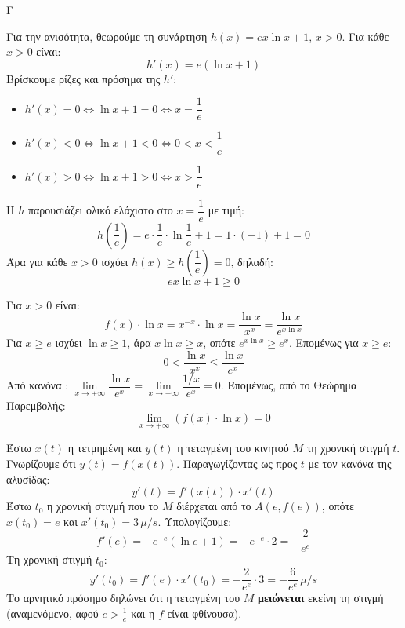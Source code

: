 \begin{thema}{Γ}
\begin{erwthma}
Για την ανισότητα, θεωρούμε τη συνάρτηση $h(x)=ex\ln x+1$, $x>0$. Για κάθε $x>0$ είναι:
\[h'(x)=e(\ln x+1)\]
Βρίσκουμε ρίζες και πρόσημα της $h'$:
\begin{itemize}
\item $h'(x)=0\Leftrightarrow \ln x+1=0\Leftrightarrow x=\dfrac{1}{e}$
\item $h'(x)<0\Leftrightarrow \ln x+1<0\Leftrightarrow 0<x<\dfrac{1}{e}$
\item $h'(x)>0\Leftrightarrow \ln x+1>0\Leftrightarrow x>\dfrac{1}{e}$
\end{itemize}
\begin{center}
\end{center}
Η $h$ παρουσιάζει ολικό ελάχιστο στο $x=\dfrac{1}{e}$ με τιμή:
\[h\!\left(\frac{1}{e}\right)=e\cdot\frac{1}{e}\cdot\ln\frac{1}{e}+1=1\cdot(-1)+1=0\]
Άρα για κάθε $x>0$ ισχύει $h(x)\geq h\!\left(\dfrac{1}{e}\right)=0$, δηλαδή:
\[ex\ln x+1\geq 0\]

\item Για $x>0$ είναι:
\[f(x)\cdot\ln x = x^{-x}\cdot\ln x = \frac{\ln x}{x^x}=\frac{\ln x}{e^{x\ln x}}\]
Για $x\geq e$ ισχύει $\ln x\geq 1$, άρα $x\ln x\geq x$, οπότε $e^{x\ln x}\geq e^x$. Επομένως για $x\geq e$:
\[0<\frac{\ln x}{x^x}\leq\frac{\ln x}{e^x}\]
Από κανόνα : $\lim\limits_{x\to+\infty}\dfrac{\ln x}{e^x}=\lim\limits_{x\to+\infty}\dfrac{1/x}{e^x}=0$. Επομένως, από το Θεώρημα Παρεμβολής:
\[\lim_{x\to+\infty}\left(f(x)\cdot\ln x\right)=0\]

\item Έστω $x(t)$ η τετμημένη και $y(t)$ η τεταγμένη του κινητού $M$ τη χρονική στιγμή $t$. Γνωρίζουμε ότι $y(t)=f(x(t))$. Παραγωγίζοντας ως προς $t$ με τον κανόνα της αλυσίδας:
\[y'(t)=f'(x(t))\cdot x'(t)\]
Έστω $t_0$ η χρονική στιγμή που το $M$ διέρχεται από το $A\!\left(e,f(e)\right)$, οπότε $x(t_0)=e$ και $x'(t_0)=3\,\mu/\si{s}$. Υπολογίζουμε:
\[f'(e)=-e^{-e}(\ln e+1)=-e^{-e}\cdot 2=-\frac{2}{e^e}\]
Τη χρονική στιγμή $t_0$:
\[y'(t_0)=f'(e)\cdot x'(t_0)=-\frac{2}{e^e}\cdot 3=-\frac{6}{e^e}\,\mu/\si{s}\]
Το αρνητικό πρόσημο δηλώνει ότι η τεταγμένη του $M$ \textbf{μειώνεται} εκείνη τη στιγμή (αναμενόμενο, αφού $e>\frac{1}{e}$ και η $f$ είναι φθίνουσα).
\end{erwthma}
\end{thema}

